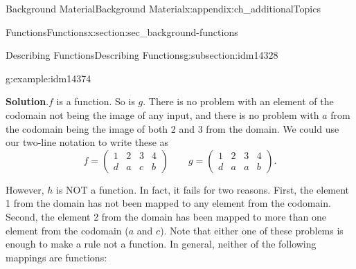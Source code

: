 \documentclass[oneside,10pt,]{book}
\numberwithin{equation}{chapter}
\newcommand{\amp}{&}
\begin{document}
\begin{appendixptx}{Background Material}{}{Background Material}{}{}{x:appendix:ch_additionalTopics}
\begin{sectionptx}{Functions}{}{Functions}{}{}{x:section:sec_background-functions}
\begin{subsectionptx}{Describing Functions}{}{Describing Functions}{}{}{g:subsection:idm14328}
\begin{example}{}{g:example:idm14374}
\begin{sidebyside}{3}{0.0416666666666667}{0.0416666666666667}{0.0833333333333333}
\begin{sbspanel}{0.25}
{}%
\end{sbspanel}%
\end{sidebyside}%
\par\smallskip%
\noindent\textbf{Solution}.\hypertarget{g:solution:idm14386}{}\quad{}\(f\) is a function. So is \(g\). There is no problem with an element of the codomain not being the image of any input, and there is no problem with \(a\) from the codomain being the image of both 2 and 3 from the domain. We could use our two-line notation to write these as%
\begin{equation*}
f= \begin{pmatrix} 1 \amp 2 \amp 3 \amp 4 \\ d \amp a \amp c \amp b \end{pmatrix} \qquad g = \begin{pmatrix} 1 \amp 2 \amp 3 \amp 4 \\ d \amp a \amp a \amp b \end{pmatrix}.
\end{equation*}
%
\par
However, \(h\) is NOT a function. In fact, it fails for two reasons. First, the element 1 from the domain has not been mapped to any element from the codomain. Second, the element 2 from the domain has been mapped to more than one element from the codomain (\(a\) and \(c\)). Note that either one of these problems is enough to make a rule not a function. In general, neither of the following mappings are functions:%
\begin{sidebyside}{2}{0.1375}{0.1375}{0.275}%
\begin{sbspanel}{0.18}%
%
\end{sbspanel}%
\begin{sbspanel}{0.27}%
\end{sbspanel}
\end{sidebyside}
\end{example}
\end{subsectionptx}
\end{sectionptx}
\end{appendixptx}
\end{document}
